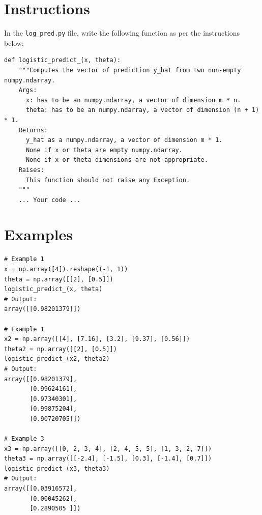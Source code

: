 \documentclass{42-en}
\begin{document}
\section*{Instructions}
In the \texttt{log\_pred.py} file, write the following function as per the instructions below:
\par
\begin{verbatim}
def logistic_predict_(x, theta):
    """Computes the vector of prediction y_hat from two non-empty numpy.ndarray.
    Args:
      x: has to be an numpy.ndarray, a vector of dimension m * n.
      theta: has to be an numpy.ndarray, a vector of dimension (n + 1) * 1.
    Returns:
      y_hat as a numpy.ndarray, a vector of dimension m * 1.
      None if x or theta are empty numpy.ndarray.
      None if x or theta dimensions are not appropriate.
    Raises:
      This function should not raise any Exception.
    """
    ... Your code ...
\end{verbatim}

\section*{Examples}

\begin{verbatim}
# Example 1
x = np.array([4]).reshape((-1, 1))
theta = np.array([[2], [0.5]])
logistic_predict_(x, theta)
# Output: 
array([[0.98201379]])

# Example 1
x2 = np.array([[4], [7.16], [3.2], [9.37], [0.56]])
theta2 = np.array([[2], [0.5]]) 
logistic_predict_(x2, theta2)
# Output: 
array([[0.98201379],
       [0.99624161],
       [0.97340301],
       [0.99875204],
       [0.90720705]])

# Example 3
x3 = np.array([[0, 2, 3, 4], [2, 4, 5, 5], [1, 3, 2, 7]])
theta3 = np.array([[-2.4], [-1.5], [0.3], [-1.4], [0.7]])
logistic_predict_(x3, theta3)
# Output: 
array([[0.03916572],
       [0.00045262],
       [0.2890505 ]])
\end{verbatim}


\newpage

\end{document}
